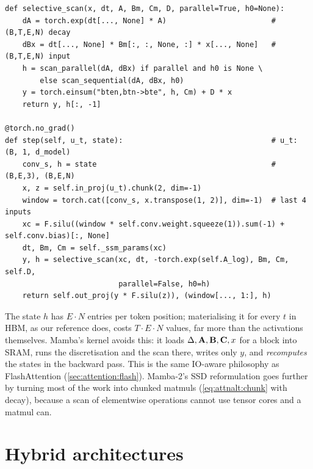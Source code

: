\begin{lstlisting}[caption={The selective scan and the Mamba block's decode step (\texttt{llmsys/ssm.py}, abridged).},label={lst:attnalt:mamba}]
def selective_scan(x, dt, A, Bm, Cm, D, parallel=True, h0=None):
    dA = torch.exp(dt[..., None] * A)                        # (B,T,E,N) decay
    dBx = dt[..., None] * Bm[:, :, None, :] * x[..., None]   # (B,T,E,N) input
    h = scan_parallel(dA, dBx) if parallel and h0 is None \
        else scan_sequential(dA, dBx, h0)
    y = torch.einsum("bten,btn->bte", h, Cm) + D * x
    return y, h[:, -1]

@torch.no_grad()
def step(self, u_t, state):                                  # u_t: (B, 1, d_model)
    conv_s, h = state                                        # (B,E,3), (B,E,N)
    x, z = self.in_proj(u_t).chunk(2, dim=-1)
    window = torch.cat([conv_s, x.transpose(1, 2)], dim=-1)  # last 4 inputs
    xc = F.silu((window * self.conv.weight.squeeze(1)).sum(-1) + self.conv.bias)[:, None]
    dt, Bm, Cm = self._ssm_params(xc)
    y, h = selective_scan(xc, dt, -torch.exp(self.A_log), Bm, Cm, self.D,
                          parallel=False, h0=h)
    return self.out_proj(y * F.silu(z)), (window[..., 1:], h)
\end{lstlisting}

\begin{systemslens}
The state $h$ has $E\cdot N$ entries per token position; materialising it for every $t$ in HBM, as our
reference does, costs $T\cdot E\cdot N$ values, far more than the activations themselves. Mamba's kernel
avoids this: it loads $\Delta,\mathbf{A},\mathbf{B},\mathbf{C},x$ for a block into SRAM, runs the discretisation and
the scan there, writes only $y$, and \emph{recomputes} the states in the backward pass. This is the same
IO-aware philosophy as FlashAttention (\cref{sec:attention:flash}). Mamba-2's SSD reformulation goes
further by turning most of the work into chunked matmuls (\cref{eq:attnalt:chunk} with decay), because a
scan of elementwise operations cannot use tensor cores and a matmul can.
\end{systemslens}

\section{Hybrid architectures}\label{sec:attnalt:hybrid}

